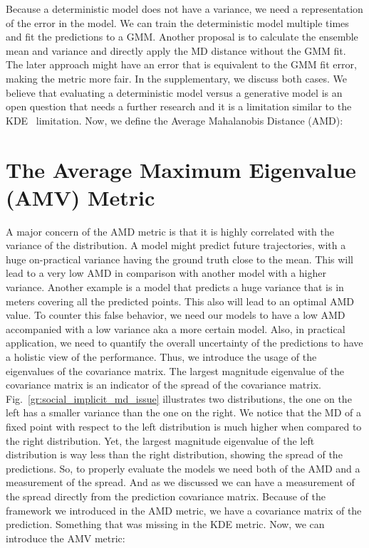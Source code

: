 \documentclass[runningheads]{llncs}
\begin{document}
Because a deterministic model does not have a variance, we need a representation of the error in the model. We can train the deterministic model multiple times and fit the predictions to a GMM. Another proposal is to calculate the ensemble mean and variance and directly apply the MD distance without the GMM fit. The later approach might have an error that is equivalent to the GMM fit error, making the metric more fair. In the supplementary, we discuss both cases. We believe that evaluating a deterministic model versus a generative model is an open question that needs a further research and it is a limitation similar to the KDE~\cite{ivanovic2019trajectron} limitation. Now, we define the Average Mahalanobis Distance (AMD):


\section{The Average Maximum Eigenvalue (AMV) Metric}
A major concern of the AMD metric is that it is highly correlated with the variance of the distribution. A model might predict future trajectories, with a huge on-practical variance having the ground truth close to the mean. This will lead to a very low AMD in comparison with another model with a higher variance. Another example is a model that predicts a huge variance that is in meters covering all the predicted points. This also will lead to an optimal AMD value. To counter this false behavior, we need our models to have a low AMD accompanied with a low variance aka a more certain model. Also, in practical application, we need to quantify the overall uncertainty of the predictions to have a holistic view of the performance. Thus, we introduce the usage of the eigenvalues of the covariance matrix. The largest magnitude eigenvalue of the covariance matrix is an indicator of the spread of the covariance matrix. Fig.~\ref{gr:social_implicit_md_issue} illustrates two distributions, the one on the left has a smaller variance than the one on the right. We notice that the MD of a fixed point with respect to the left distribution is much higher when compared to the right distribution. Yet, the largest magnitude eigenvalue of the left distribution is way less than the right distribution, showing the spread of the predictions. So, to properly evaluate the models we need both of the AMD and a measurement of the spread. And as we discussed we can have a measurement of the spread directly from the prediction covariance matrix. Because of the framework we introduced in the AMD metric, we have a covariance matrix of the prediction. Something that was missing in the KDE metric. Now, we can introduce the AMV metric:
\end{document}
